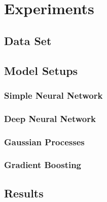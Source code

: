 \section{Experiments}%
\label{sec:experiments}

\subsection{Data Set}%
\label{sub:dataset}

\subsection{Model Setups}%
\label{sub:model_setups}

\subsubsection{Simple Neural Network}%
\label{ssub:simple_neural_network}

\subsubsection{Deep Neural Network}%
\label{ssub:deep_neural_network}

\subsubsection{Gaussian Processes}%
\label{ssub:gaussian_processes}

\subsubsection{Gradient Boosting}%
\label{ssub:gradient_boosting}

\subsection{Results}%
\label{sub:results}
